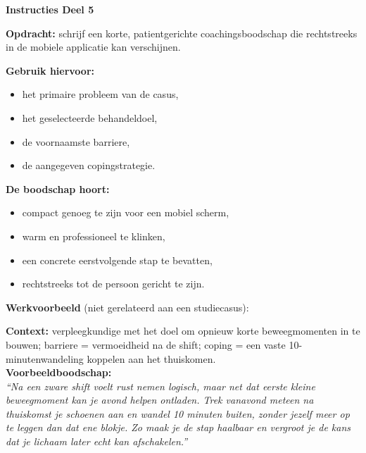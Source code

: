\documentclass[11pt,a4paper]{article}
\begin{document}
\begin{tcolorbox}[colback=red!3,colframe=ForestGreen,arc=2.5mm,boxrule=0.9pt,
  left=10pt,right=10pt,top=9pt,bottom=9pt]
\textbf{\color{ForestGreen}Instructies Deel 5}

\smallskip\small
\textbf{Opdracht:} schrijf een korte, patientgerichte coachingsboodschap die rechtstreeks in de
mobiele applicatie kan verschijnen.

\textbf{Gebruik hiervoor:}
\begin{itemize}[topsep=2pt,itemsep=2pt]
\item het primaire probleem van de casus,
\item het geselecteerde behandeldoel,
\item de voornaamste barriere,
\item de aangegeven copingstrategie.
\end{itemize}

\textbf{De boodschap hoort:}
\begin{itemize}[topsep=2pt,itemsep=2pt]
\item compact genoeg te zijn voor een mobiel scherm,
\item warm en professioneel te klinken,
\item een concrete eerstvolgende stap te bevatten,
\item rechtstreeks tot de persoon gericht te zijn.
\end{itemize}

\textbf{Werkvoorbeeld} (niet gerelateerd aan een studiecasus):
\begin{tcolorbox}[colback=SoftBG,colframe=BorderGrey,boxrule=0.4pt,arc=1.5mm,
  left=7pt,right=7pt,top=5pt,bottom=5pt]
\small
\textbf{Context:} verpleegkundige met het doel om opnieuw korte beweegmomenten in te bouwen;
barriere = vermoeidheid na de shift; coping = een vaste 10-minutenwandeling koppelen aan het thuiskomen.\\[0.3em]
\textbf{Voorbeeldboodschap:}\\
\textit{``Na een zware shift voelt rust nemen logisch, maar net dat eerste kleine beweegmoment kan je avond helpen ontladen. Trek vanavond meteen na thuiskomst je schoenen aan en wandel 10 minuten buiten, zonder jezelf meer op te leggen dan dat ene blokje. Zo maak je de stap haalbaar en vergroot je de kans dat je lichaam later echt kan afschakelen.''}
\end{tcolorbox}
\end{tcolorbox}

\vspace{0.5em}
\end{document}
